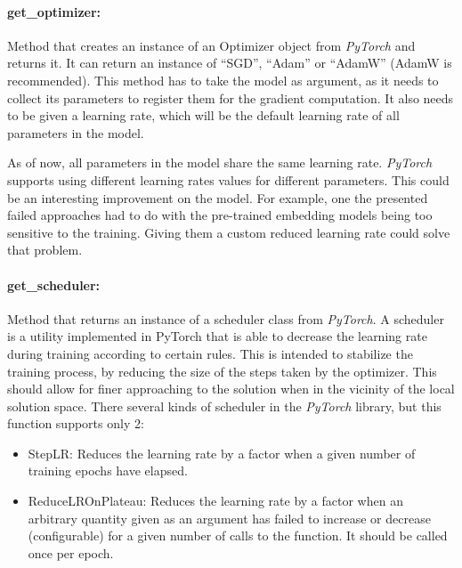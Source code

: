 \documentclass[a4paper, 11pt]{report}
\begin{document}
   \paragraph{get\_optimizer:} Method that creates an instance of an Optimizer object from \textit{PyTorch} and returns it. It can return an instance of ``SGD'', ``Adam'' or ``AdamW'' (AdamW is recommended). This method has to take the model as argument, as it needs to collect its parameters to register them for the gradient computation. It also needs to be given a learning rate, which will be the default learning rate of all parameters in the model.
    \begin{tcolorbox}[title=Future Development: allow different learning rates, colback=white,colframe=green!40!black]
    As of now, all parameters in the model share the same learning rate. \textit{PyTorch} supports using different learning rates values for different parameters. This could be an interesting improvement on the model. For example, one the presented failed approaches had to do with the pre-trained embedding models being too sensitive to the training. Giving them a custom reduced learning rate could solve that problem.
    \end{tcolorbox}

   \paragraph{get\_scheduler:} Method that returns an instance of a scheduler class from \textit{PyTorch}. A scheduler is a utility implemented in PyTorch that is able to decrease the learning rate during training according to certain rules. This is intended to stabilize the training process, by reducing the size of the steps taken by the optimizer. This should allow for finer approaching to the solution when in the vicinity of the local solution space. There several kinds of scheduler in the \textit{PyTorch} library, but this function supports only 2:
   \begin{itemize}
       \item StepLR: Reduces the learning rate by a factor when a given number of training epochs have elapsed.
       \item ReduceLROnPlateau: Reduces the learning rate by a factor when an arbitrary quantity given as an argument has failed to increase or decrease (configurable) for a given number of calls to the function. It should be called once per epoch.
   \end{itemize}
\end{document}
